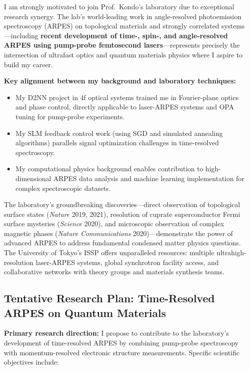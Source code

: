 \documentclass[11pt,a4paper]{article}
\begin{document}
I am strongly motivated to join Prof.~Kondo's laboratory due to exceptional research synergy. The lab's world-leading work in angle-resolved photoemission spectroscopy (ARPES) on topological materials and strongly correlated systems—including \textbf{recent development of time-, spin-, and angle-resolved ARPES using pump-probe femtosecond lasers}—represents precisely the intersection of ultrafast optics and quantum materials physics where I aspire to build my career.

\textbf{Key alignment between my background and laboratory techniques:}
\begin{itemize}
    \item My D2NN project in 4f optical systems trained me in Fourier-plane optics and phase control, directly applicable to laser-ARPES systems and OPA tuning for pump-probe experiments.
    \item My SLM feedback control work (using SGD and simulated annealing algorithms) parallels signal optimization challenges in time-resolved spectroscopy.
    \item My computational physics background enables contribution to high-dimensional ARPES data analysis and machine learning implementation for complex spectroscopic datasets.
\end{itemize}

The laboratory's groundbreaking discoveries—direct observation of topological surface states (\textit{Nature} 2019, 2021), resolution of cuprate superconductor Fermi surface mysteries (\textit{Science} 2020), and microscopic observation of complex magnetic phases (\textit{Nature Communications} 2020)—demonstrate the power of advanced ARPES to address fundamental condensed matter physics questions. The University of Tokyo's ISSP offers unparalleled resources: multiple ultrahigh-resolution laser-ARPES systems, global synchrotron facility access, and collaborative networks with theory groups and materials synthesis teams.

\subsection{Tentative Research Plan: Time-Resolved ARPES on Quantum Materials}

\textbf{Primary research direction:} I propose to contribute to the laboratory's development of time-resolved ARPES by combining pump-probe spectroscopy with momentum-resolved electronic structure measurements. Specific scientific objectives include:
\end{document}
